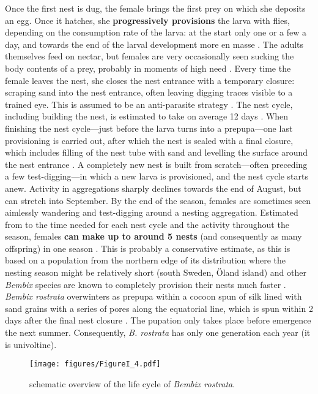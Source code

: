 \documentclass[10pt, twoside]{book} %
\begin{document}
	Once the first nest is dug, the female brings the first prey on which she deposits an egg. Once it hatches, she \textbf{progressively provisions} the larva with flies, depending on the consumption rate of the larva: at the start only one or a few a day, and towards the end of the larval development more en masse \citep{tengo1996, asis2004}. The adults themselves feed on nectar, but females are very occasionally seen sucking the body contents of a prey, probably in moments of high need \citep{nielsen1945, evans2007}. Every time the female leaves the nest, she closes the nest entrance with a temporary closure: scraping sand into the nest entrance, often leaving digging traces visible to a trained eye. This is assumed to be an anti-parasite strategy \citep{evans1966, evans2007, polidori2009a}. The nest cycle, including building the nest, is estimated to take on average 12 days \citep{larsson1989}. When finishing the nest cycle---just before the larva turns into a prepupa---one last provisioning is carried out, after which the nest is sealed with a final closure, which includes filling of the nest tube with sand and levelling the surface around the nest entrance \citep{tengo1996}. A completely new nest is built from scratch---often preceding a few test-digging---in which a new larva is provisioned, and the nest cycle starts anew. Activity in aggregations sharply declines towards the end of August, but can stretch into September. By the end of the season, females are sometimes seen aimlessly wandering and test-digging around a nesting aggregation. Estimated from to the time needed for each nest cycle and the activity throughout the season, females \textbf{can make up to around 5 nests} (and consequently as many offspring) in one season \citep{larsson1989, tengo1996}. This is probably a conservative estimate, as this is based on a population from the northern edge of its distribution where the nesting season might be relatively short (south Sweden, \"{O}land island) and other \textit{Bembix} species are known to completely provision their nests much faster \citep{evans2007}. \textit{Bembix rostrata} overwinters as prepupa within a cocoon spun of silk lined with sand grains with a series of pores along the equatorial line, which is spun within 2 days after the final nest closure \citep{nielsen1945, evans2007}. The pupation only takes place before emergence the next summer. Consequently, \textit{B. rostrata} has only one generation each year (it is univoltine).\\
	
	\vspace*{\fill}
	\begin{figure}[ht!]
		\begin{center}
			\hspace*{-1cm}
			\texttt{[image: figures/FigureI\_4.pdf]}
		\end{center}
		\begin{footnotesize}
			\caption{schematic overview of the life cycle of \textit{Bembix rostrata}. \label{figI.4}}
		\end{footnotesize}
	\end{figure}
	\vspace*{\fill}
	\clearpage
	
\end{document}
